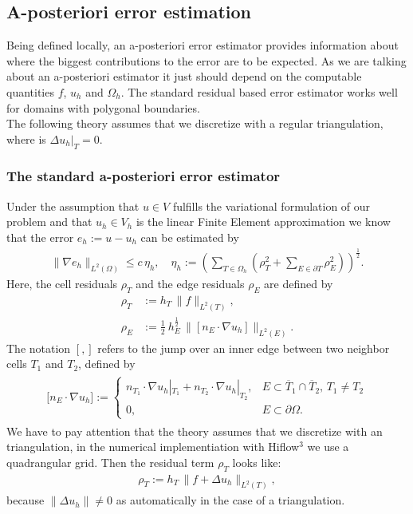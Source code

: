 \documentclass[a4paper, 11pt, twoside]{article}
\begin{document}
\subsection{A-posteriori error estimation}
Being defined locally, an a-posteriori error estimator provides information about where the biggest contributions to the error are to be expected.
As we are talking about an a-posteriori estimator it just should depend on the computable quantities $f$, $u_h$ and $\Omega_h$.
The standard residual based error estimator works well for domains with polygonal boundaries. \\

The following theory assumes that we discretize with a regular triangulation, where is $\Delta u_h|_T = 0$.
\subsubsection{The standard a-posteriori error estimator}\label{richterskript}
Under the assumption that  $u \in V$ fulfills the variational formulation of our problem and that $u_h \in V_h$ is the linear Finite Element approximation we know that 
the error $e_h:=u-u_h$ can be estimated by
\begin{eqnarray}
\| \nabla e_h\|_{L^2(\Omega)} \leq c\, \eta_h,\quad \eta_h := \left(\sum_{T \in \Omega_h}(\rho_T^2+ \sum_{E \in \partial T}\rho_E^2)\right)^{\frac{1}{2}}.\label{aposteriori}
\end{eqnarray}
Here, the cell residuals $\rho_T$ and the edge residuals $\rho_E$ are defined by
\begin{align*}
\rho_T&:=h_T\, \| f \|_{L^2(T)},\\
\rho_E&:=\frac{1}{2}\ h_E^{\frac{1}{2}}\, \|[n_E \cdot \nabla u_h]\|_{L^2(E)}.
\end{align*}
The notation $[,]$ refers to the jump over an inner edge between two neighbor cells $T_1$ and $T_2$, defined by
\begin{align}
\begin{aligned}
     \lbrack n_E \cdot \nabla u_h \rbrack:=\left\{\begin{array}{ll} n_{T_1} \cdot \nabla u_h|_{T_1} +  n_{T_2} \cdot \nabla u_h|_{T_2}, 
     & E \subset \overline{T}_1 \cap \overline{T}_2,\, T_1\neq T_2\\
         0, & E \subset \partial \Omega. \end{array}\right. \label{jump}
\end{aligned}
\end{align}
We have to pay attention that the theory assumes that we discretize with an triangulation, in the numerical implementiation with Hiflow$^3$ we use a quadrangular grid.
Then the residual term $\rho_T$ looks like:
\begin{align*}
\rho_T:=h_T\, \| f + \Delta u_h \|_{L^2(T)},
\end{align*}
because $\|\Delta u_h \| \neq 0$ as automatically in the case of a triangulation.
\end{document}
